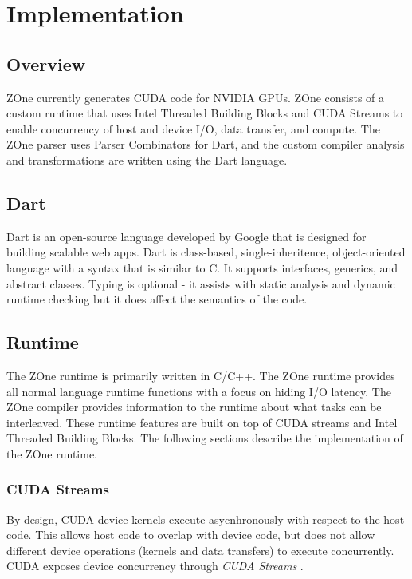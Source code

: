 \section*{Implementation}

\subsection*{Overview}

ZOne currently generates CUDA code for NVIDIA GPUs. ZOne consists of a custom
runtime that uses Intel Threaded Building Blocks and CUDA Streams to enable
concurrency of host and device I/O, data transfer, and compute. The ZOne parser
uses Parser Combinators for Dart\cite{dartParsers}, and the custom compiler
analysis and transformations are written using the Dart language.

\subsection*{Dart}
Dart\cite{dartlang} is an open-source language developed by Google that is
designed for building scalable web apps. Dart is class-based,
single-inheritence,
object-oriented language with a syntax that is similar to C. It supports
interfaces, generics, and abstract classes. Typing is optional - it assists
with static analysis and dynamic runtime checking but it does affect the
semantics of the code.

\subsection*{Runtime}
The ZOne runtime is primarily written in C/C++. The ZOne runtime provides all
normal language runtime functions with a focus on hiding I/O latency. The ZOne
compiler provides information to the runtime about what tasks can be
interleaved. These runtime features are built on top of CUDA streams and 
Intel Threaded Building Blocks. The following sections describe the
implementation of the ZOne runtime.

\subsubsection*{CUDA Streams}
By design, CUDA device kernels execute asycnhronously with respect to the
host code. This allows host code to overlap with device code, but does not
allow different device operations (kernels and data transfers) to execute
concurrently. CUDA exposes device concurrency through \textit{CUDA Streams}
\cite{kirk2012programming}.

